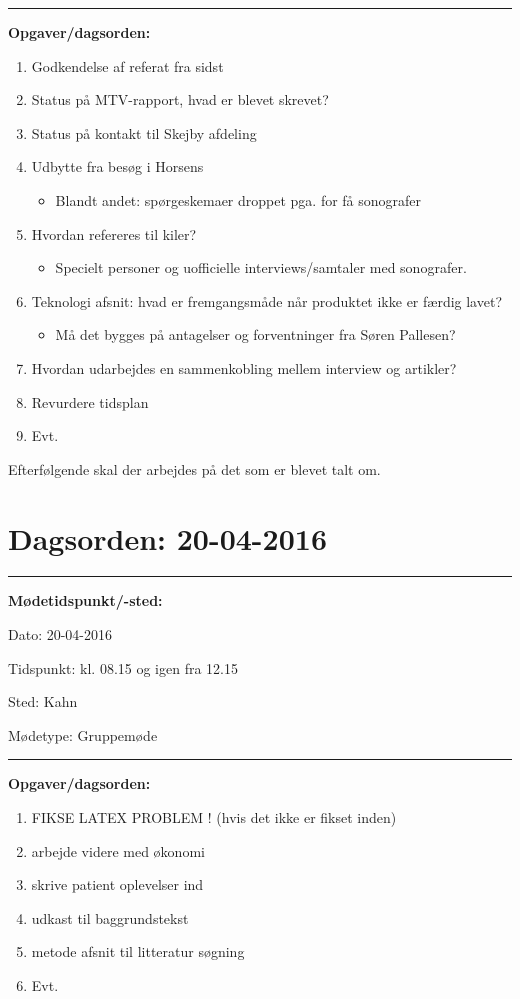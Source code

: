 \hrule
\textbf{Opgaver/dagsorden:} \newline
\begin{enumerate}
	\item Godkendelse af referat fra sidst
	\item Status på MTV-rapport, hvad er blevet skrevet?
	\item Status på kontakt til Skejby afdeling
	\item Udbytte fra besøg i Horsens
	\begin{itemize}
		\item Blandt andet: spørgeskemaer droppet pga. for få sonografer
	\end{itemize}
	\item Hvordan refereres til kiler? 
	\begin{itemize}
		\item Specielt personer og uofficielle interviews/samtaler med sonografer.
	\end{itemize}
	\item Teknologi afsnit: hvad er fremgangsmåde når produktet ikke er færdig lavet? 
	\begin{itemize}
		\item Må det bygges på antagelser og forventninger fra Søren Pallesen?
	\end{itemize}  
	\item Hvordan udarbejdes en sammenkobling mellem interview og artikler?
	\item Revurdere tidsplan
	\item Evt. 
\end{enumerate} 

Efterfølgende skal der arbejdes på det som er blevet talt om. 

\newpage
\section{Dagsorden: 20-04-2016 }
\hrule
\textbf{Mødetidspunkt/-sted:} 

Dato: \tabto{7em} 20-04-2016

Tidspunkt: \tabto{7em} kl. 08.15 og igen fra 12.15 

Sted: \tabto{7em} Kahn 

Mødetype: \tabto{7em} Gruppemøde \newline


\hrule
\textbf{Opgaver/dagsorden:} \newline
\begin{enumerate}
	\item FIKSE LATEX PROBLEM ! (hvis det ikke er fikset inden)
	\item arbejde videre med økonomi 
	\item skrive patient oplevelser ind 
	\item udkast til baggrundstekst
	\item metode afsnit til litteratur søgning
	\item Evt. 
\end{enumerate} 

